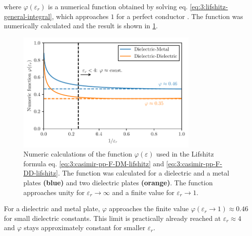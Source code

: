 where $\varphi(\varepsilon_r)$ is a numerical function obtained by solving eq. \eqref{eq:3:lifshitz-general-integral}, which approaches $1$ for a perfect conductor \cite{Lifshitz_1956}. The function was numerically calculated and the result is shown in \cref{fig:3:lifshitz-function}.
\begin{figure}[!htbp]
  \centering
  \includegraphics[width=0.8\textwidth]{./../figures/casimir/casimir-lifshitz-function.pdf}
  \caption{Numeric calculations of the function $\varphi(\varepsilon)$ used in the Lifshitz formula eq. \eqref{eq:3:casimir-pp-F-DM-lifshitz} and \eqref{eq:3:casimir-pp-F-DD-lifshitz}. The function was calculated for a dielectric and a metal plates \textbf{(blue)} and two dielectric plates \textbf{(orange)}. The function approaches unity for $\varepsilon_r\rightarrow\infty$ and a finite value for $\varepsilon_r\rightarrow 1$.}
  \label{fig:3:lifshitz-function}
\end{figure}
For a dielectric and metal plate, $\varphi$ approaches the finite value $\varphi(\varepsilon_r \rightarrow 1) \approx 0.46$ for small dielectric constants. This limit is practically already reached at $\varepsilon_r \approx 4$ and $\varphi$ stays approximately constant for smaller $\varepsilon_r$.





